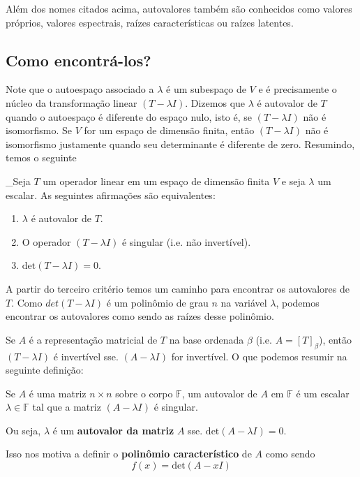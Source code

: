 \documentclass[12pt,a4paper]{article}
\begin{document}
Além dos nomes citados acima, autovalores também são conhecidos como valores próprios, valores espectrais, raízes características ou raízes latentes.

\subsection{Como encontrá-los?}

Note que o autoespaço associado a $\lambda$ é um subespaço de $V$ e é precisamente o núcleo da transformação linear $(T - \lambda I)$. Dizemos que $\lambda$ é autovalor de $T$ quando o autoespaço é diferente do espaço nulo, isto é, se $(T- \lambda I)$ não é isomorfismo. Se $V$ for um espaço de dimensão finita, então $(T- \lambda I)$ não é isomorfismo justamente quando seu determinante é diferente de zero. Resumindo, temos o seguinte

\begin{teorema}{}
_Seja $T$ um operador linear em um espaço de dimensão finita $V$ e seja $\lambda$ um escalar. As seguintes afirmações são equivalentes:
\begin{enumerate}
\item $\lambda$ é autovalor de $T$.
\item O operador $(T- \lambda I)$ é singular (i.e. não invertível).
\item $\text{det}(T - \lambda I) = 0$.
\end{enumerate}
\end{teorema}

A partir do terceiro critério temos um caminho para encontrar os autovalores de $T$. Como $det(T - \lambda I)$ é um polinômio de grau $n$ na variável $\lambda$, podemos encontrar os autovalores como sendo as raízes desse polinômio.

Se $A$ é a representação matricial de $T$ na base ordenada $\beta$ (i.e. $A = [T]_\beta$), então $(T-\lambda I)$ é invertível sse. $(A - \lambda I)$ for invertível. O que podemos resumir na seguinte definição:

Se $A$ é uma matriz $n \times n$ sobre o corpo $\mathbb{F}$, um autovalor de $A$ em $\mathbb{F}$ é um escalar $\lambda \in \mathbb{F}$ tal que a matriz $(A - \lambda I)$ é singular.

Ou seja, $\lambda$ é um \textbf{autovalor da matriz} $A$ sse. $\text{det}(A-\lambda I) = 0$.

Isso nos motiva a definir o \textbf{polinômio característico} de $A$ como sendo \[ f(x) = \text{det}(A-xI) \]
\end{document}
